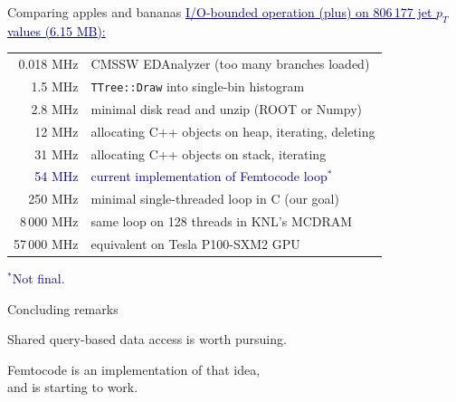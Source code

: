 \documentclass{beamer}
\begin{document}
\begin{frame}{Comparing apples and bananas}
\vspace{0.5 cm}
\textcolor{darkblue}{\underline{I/O-bounded operation (plus) on 806\,177 jet $p_T$ values (6.15 MB):}}

\vspace{-0.4 cm}
\begin{center}
\renewcommand{\arraystretch}{1.2}
\small
\begin{tabular}{r l}
0.018 MHz & CMSSW EDAnalyzer (too many branches loaded) \\
1.5 MHz & {\tt TTree::Draw} into single-bin histogram \\
2.8 MHz & minimal disk read and unzip (ROOT or Numpy) \\
12 MHz & allocating C++ objects on heap, iterating, deleting \\
31 MHz & allocating C++ objects on stack, iterating \\
\textcolor{darkblue}{54 MHz} & \textcolor{darkblue}{current implementation of Femtocode loop$^*$} \\
250 MHz & minimal single-threaded loop in C (our goal) \\
8\,000 MHz & same loop on 128 threads in KNL's MCDRAM \\
57\,000 MHz & equivalent on Tesla P100-SXM2 GPU \\
\end{tabular}
\end{center}

\vspace{0.5 cm}
\textcolor{darkblue}{$^*$Not final.}
\end{frame}

\begin{frame}{Concluding remarks}
\begin{center}
\Large
Shared query-based data access is worth pursuing.

\vspace{0.5 cm}
Femtocode is an implementation of that idea, \\ and is starting to work.
\end{center}
\end{frame}
\end{document}
